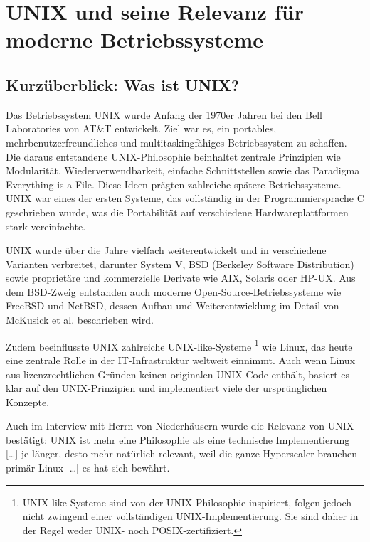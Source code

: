 \section{UNIX und seine Relevanz für moderne Betriebssysteme}


\subsection{Kurzüberblick: Was ist UNIX?}

Das Betriebssystem UNIX wurde Anfang der 1970er Jahren bei den Bell Laboratories von AT\&T entwickelt. Ziel war es, ein portables, mehrbenutzerfreundliches und
multitaskingfähiges Betriebssystem zu schaffen. Die daraus entstandene UNIX-Philosophie beinhaltet zentrale Prinzipien wie Modularität, Wiederverwendbarkeit,
einfache Schnittstellen sowie das Paradigma \glqq Everything is a File\grqq. Diese Ideen prägten zahlreiche spätere Betriebssysteme. UNIX war eines der ersten
Systeme, das vollständig in der Programmiersprache C geschrieben wurde, was die Portabilität auf verschiedene Hardwareplattformen stark vereinfachte.
\cite{ModernOS}

UNIX wurde über die Jahre vielfach weiterentwickelt und in verschiedene Varianten verbreitet, darunter System V, BSD (Berkeley Software Distribution) sowie
proprietäre und kommerzielle Derivate wie AIX, Solaris oder HP-UX. Aus dem BSD-Zweig entstanden auch moderne Open-Source-Betriebssysteme wie FreeBSD und NetBSD,
dessen Aufbau und Weiterentwicklung im Detail von McKusick et al. beschrieben wird. \cite{FreeBSDOS}

Zudem beeinflusste UNIX zahlreiche \glqq UNIX-like\grqq-Systeme \footnote{UNIX-like-Systeme sind von der UNIX-Philosophie inspiriert, folgen jedoch nicht zwingend
einer vollständigen UNIX-Implementierung. Sie sind daher in der Regel weder UNIX- noch POSIX-zertifiziert.} wie Linux, das heute eine zentrale Rolle in der
IT-Infrastruktur weltweit einnimmt. Auch wenn Linux aus lizenzrechtlichen Gründen keinen originalen UNIX-Code enthält, basiert es klar auf den UNIX-Prinzipien und
implementiert viele der ursprünglichen Konzepte. \cite{ArtOfUnixProgramming}

Auch im Interview mit Herrn von Niederhäusern wurde die Relevanz von UNIX bestätigt: \glqq UNIX ist mehr eine Philosophie als eine technische Implementierung
[\ldots] je länger, desto mehr natürlich relevant, weil die ganze Hyperscaler brauchen primär Linux [\ldots] es hat sich bewährt.\grqq \ \cite{interviewNH}



